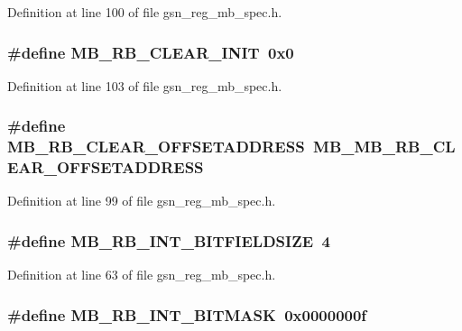 Definition at line 100 of file gsn\_\-reg\_\-mb\_\-spec.h.

\hypertarget{a00562_a76e2b46980100bd792f1578a996ca948}{
\subsubsection[{MB\_\-RB\_\-CLEAR\_\-INIT}]{\setlength{\rightskip}{0pt plus 5cm}\#define MB\_\-RB\_\-CLEAR\_\-INIT~0x0}}
\label{a00562_a76e2b46980100bd792f1578a996ca948}


Definition at line 103 of file gsn\_\-reg\_\-mb\_\-spec.h.

\hypertarget{a00562_ab00de450f30c14ea5d1cfc486c6b4f61}{
\subsubsection[{MB\_\-RB\_\-CLEAR\_\-OFFSETADDRESS}]{\setlength{\rightskip}{0pt plus 5cm}\#define MB\_\-RB\_\-CLEAR\_\-OFFSETADDRESS~MB\_\-MB\_\-RB\_\-CLEAR\_\-OFFSETADDRESS}}
\label{a00562_ab00de450f30c14ea5d1cfc486c6b4f61}


Definition at line 99 of file gsn\_\-reg\_\-mb\_\-spec.h.

\hypertarget{a00562_ab631f7c502b0888aad4f38c1d9f0347a}{
\subsubsection[{MB\_\-RB\_\-INT\_\-BITFIELDSIZE}]{\setlength{\rightskip}{0pt plus 5cm}\#define MB\_\-RB\_\-INT\_\-BITFIELDSIZE~4}}
\label{a00562_ab631f7c502b0888aad4f38c1d9f0347a}


Definition at line 63 of file gsn\_\-reg\_\-mb\_\-spec.h.

\hypertarget{a00562_a0266c9edf244f9ffa89a11e1272b38c9}{
\subsubsection[{MB\_\-RB\_\-INT\_\-BITMASK}]{\setlength{\rightskip}{0pt plus 5cm}\#define MB\_\-RB\_\-INT\_\-BITMASK~0x0000000f}}
\label{a00562_a0266c9edf244f9ffa89a11e1272b38c9}


